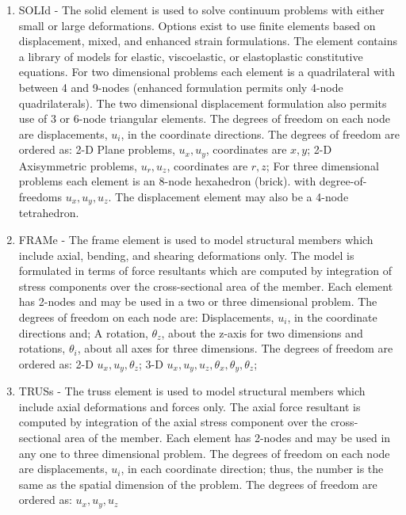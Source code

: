 \begin{enumerate}
\item
SOLId - The solid element is used to solve continuum problems with
either small or large deformations.
Options exist to use finite elements based on displacement,
mixed, and enhanced strain formulations.
The element contains a library of
models for elastic, viscoelastic, or elastoplastic constitutive equations.
For two dimensional problems each element is a quadrilateral
with between 4 and 9-nodes (enhanced formulation permits only 4-node
quadrilaterals).  The two dimensional displacement formulation also permits
use of 3 or 6-node triangular elements.
The degrees of freedom on each node are displacements,
$u_i$, in the coordinate directions.
The degrees of freedom are ordered as:
2-D Plane problems, $u_x , u_y $, coordinates are $x , y$;
2-D Axisymmetric problems, $u_r , u_z $, coordinates are $r , z$;
For three dimensional problems each element is an 8-node hexahedron (brick).
with degree-of-freedoms $u_x , u_y , u_z$.
The displacement element may also be a 4-node tetrahedron.

\item
FRAMe - The frame element is used to model structural members which include
axial, bending, and shearing deformations only.  The model is formulated in
terms of force resultants which are computed by integration of stress components
over the cross-sectional area of the member.
Each element has 2-nodes and may be used in a two or three dimensional
problem.  The degrees of freedom on each node are: Displacements, $u_i$, in the
coordinate directions and; A rotation, $\theta_z$, about the z-axis
for two dimensions
and rotations, $\theta_i$, about all axes for three dimensions.
The degrees of freedom are ordered as:
2-D $u_x , u_y , \theta_z$;
3-D $u_x , u_y , u_z , \theta_x , \theta_y , \theta_z$;

\item
TRUSs - The truss element is used to model structural members which include
axial deformations and forces only.  The axial
force resultant is computed by integration of the axial stress component
over the cross-sectional area of the member.
Each element has 2-nodes and may be used in any one to three dimensional
problem.  The degrees of freedom on each node are displacements, $u_i$, in each
coordinate direction; thus, the number is the same as the spatial dimension
of the problem.
The degrees of freedom are ordered as: $u_x , u_y , u_z$


\end{enumerate}
